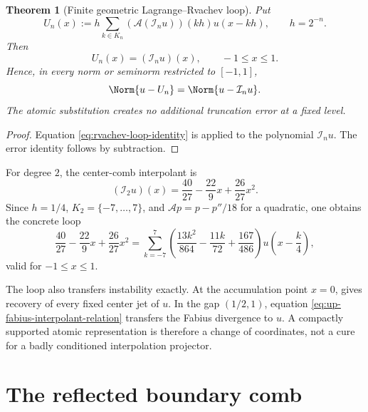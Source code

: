 \documentclass[11pt,oneside]{book}
\numberwithin{equation}{chapter}
\newtheorem{theorem}{Theorem}[chapter]
\theoremstyle{definition}
\theoremstyle{remark}
\newcommand{\App}{\mathcal A}
\newcommand{\Interp}{\mathcal I}
\begin{document}
\begin{theorem}[Finite geometric Lagrange--Rvachev loop]
\label{thm:finite-rvachev-loop}
Put
\begin{equation}
 U_n(x):=h\sum_{k\in K_n}
   (\App(\Interp_nu))(kh)u(x-kh),
 \qquad h=2^{-n}.
 \label{eq:rvachev-loop-definition}
\end{equation}
Then
\begin{equation}
 \boxed{U_n(x)=(\Interp_nu)(x),\qquad -1\le x\le1.}
 \label{eq:rvachev-loop-identity}
\end{equation}
Hence, in every norm or seminorm restricted to $[-1,1]$,
\begin{equation}
 \Norm{u-U_n}=\Norm{u-\Interp_nu}.
 \label{eq:rvachev-loop-error-transfer}
\end{equation}
The atomic substitution creates no additional truncation error at a fixed
level.
\end{theorem}

\begin{proof}
Equation \eqref{eq:rvachev-loop-identity} is
 applied to the polynomial
$\Interp_nu$.  The error identity follows by subtraction.
\end{proof}

For degree $2$, the center-comb interpolant is
\begin{equation}
 (\Interp_2u)(x)=\frac{40}{27}-\frac{22}{9}x+\frac{26}{27}x^2.
 \label{eq:up-degree-two-interpolant}
\end{equation}
Since $h=1/4$, $K_2=\{-7,\ldots,7\}$, and
$\App p=p-p''/18$ for a quadratic, one obtains the concrete loop
\begin{equation}
 \boxed{
 \frac{40}{27}-\frac{22}{9}x+\frac{26}{27}x^2
 =\sum_{k=-7}^{7}
 \left(\frac{13k^2}{864}-\frac{11k}{72}+\frac{167}{486}\right)
 u\!\left(x-\frac{k}{4}\right),}
 \label{eq:up-degree-two-loop}
\end{equation}
valid for $-1\le x\le1$.

The loop also transfers instability exactly.  At the accumulation point
$x=0$,  gives recovery of every fixed center jet
of $u$.  In the gap $(1/2,1)$, equation
\eqref{eq:up-fabius-interpolant-relation} transfers the Fabius divergence to
$u$.  A compactly supported atomic representation is therefore a change of
coordinates, not a cure for a badly conditioned interpolation projector.

\section{The reflected boundary comb}
\end{document}
